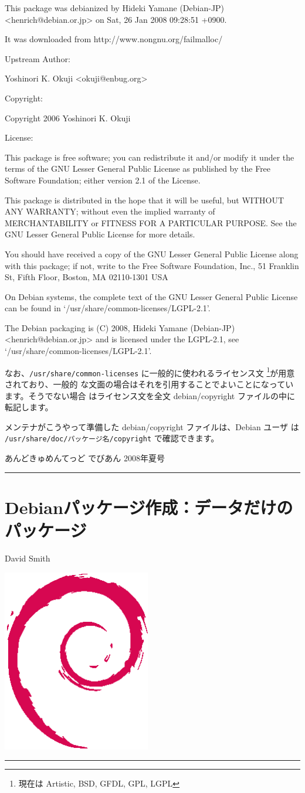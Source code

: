 \documentclass[mingoth,a4paper]{jsarticle}
\renewcommand{\dancersection}[2]{%
\newpage
あんどきゅめんてっど でびあん 2008年夏号
%
\vspace{0.1mm}\\
{\color{dancerlightblue}\rule{\hsize}{2mm}}

%
%
\begin{minipage}[t]{0.6\hsize}
\color{dancerdarkblue}
\vspace{1cm}
\section{#1}
\hfill{}#2\\
\end{minipage}
\begin{minipage}[t]{0.4\hsize}
\vspace{-2cm}
\hfill{}\includegraphics[height=8cm]{image200502/openlogo-nd.eps}\\
\vspace{-5cm}
\end{minipage}
%
%
{\color{dancerdarkblue}\rule{0.74\hsize}{2mm}}
%
\vspace{2cm}
}
\begin{document}
\begin{commandline}
 This package was debianized by Hideki Yamane (Debian-JP) <henrich@debian.or.jp> on
Sat, 26 Jan 2008 09:28:51 +0900.

It was downloaded from http://www.nongnu.org/failmalloc/

Upstream Author: 

    Yoshinori K. Okuji <okuji@enbug.org>

Copyright: 

    Copyright 2006 Yoshinori K. Okuji

License:

    This package is free software; you can redistribute it and/or
    modify it under the terms of the GNU Lesser General Public
    License as published by the Free Software Foundation; either
    version 2.1 of the License.

    This package is distributed in the hope that it will be useful,
    but WITHOUT ANY WARRANTY; without even the implied warranty of
    MERCHANTABILITY or FITNESS FOR A PARTICULAR PURPOSE.  See the GNU
    Lesser General Public License for more details.

    You should have received a copy of the GNU Lesser General Public
    License along with this package; if not, write to the Free Software
    Foundation, Inc., 51 Franklin St, Fifth Floor, Boston, MA  02110-1301 USA

On Debian systems, the complete text of the GNU Lesser General
Public License can be found in `/usr/share/common-licenses/LGPL-2.1'.

The Debian packaging is (C) 2008, Hideki Yamane (Debian-JP) <henrich@debian.or.jp> and
is licensed under the LGPL-2.1, see `/usr/share/common-licenses/LGPL-2.1'.


\end{commandline}

なお、\texttt{/usr/share/common-licenses} に一般的に使われるライセンス文
\footnote{現在は Artistic, BSD, GFDL, GPL, LGPL}が用意されており、一般的
な文面の場合はそれを引用することでよいことになっています。そうでない場合
はライセンス文を全文 debian/copyright ファイルの中に転記します。

メンテナがこうやって準備した debian/copyright ファイルは、Debian ユーザ
は \texttt{/usr/share/doc/パッケージ名/copyright} で確認できます。



\dancersection{Debianパッケージ作成：データだけのパッケージ}{David Smith}
\label{sec:datapackage}
\end{document}
